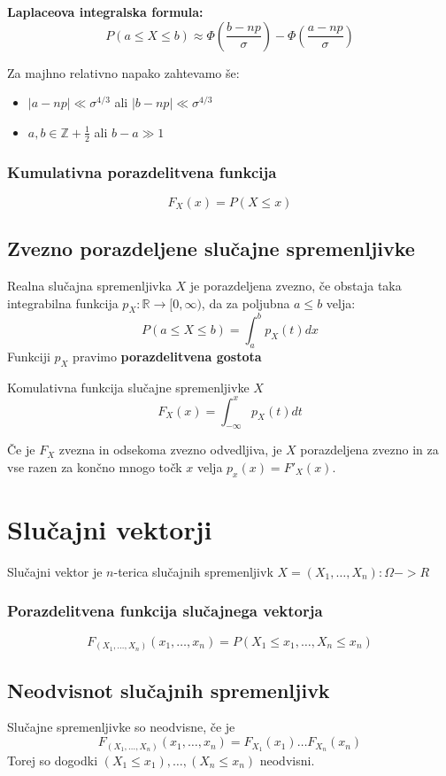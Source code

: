 \begin{multicols}{5}
\textbf{Laplaceova integralska formula: }
\[ P(a \leq X \leq b) \approx \Phi\left( \frac{b - np}{\sigma} \right) - \Phi\left( \frac{a - np}{\sigma} \right) \]

Za majhno relativno napako zahtevamo še: 
\begin{itemize}
    \item $|a-np| \ll \sigma^{4/3}$ ali $|b-np| \ll \sigma^{4/3}$ 	
    \item $a, b \in \mathbb{Z} + \frac{1}{2}$ ali $b - a \gg 1$
\end{itemize}

\subsubsection{Kumulativna porazdelitvena funkcija}
\[ F_X(x) = P(X \leq x)\]

\subsection{Zvezno porazdeljene slučajne spremenljivke}
Realna slučajna spremenljivka $X$ je porazdeljena zvezno, če obstaja taka integrabilna funkcija $p_X: \mathbb{R} \to [0, \infty)$, da za poljubna $a \leq b$ velja:
\[ P( a \leq X \leq b) = \int_a^b p_X(t) dx \]
Funkciji $p_X$ pravimo \textbf{porazdelitvena gostota}


Komulativna funkcija slučajne spremenljivke $X$
\[ F_X(x) = \int_{-\infty}^x p_X(t) dt \]

Če je $F_X$ zvezna in odsekoma zvezno odvedljiva, je $X$ porazdeljena zvezno in za vse razen za končno mnogo točk $x$ velja $p_x(x) = F'_X(x)$.

\section{Slučajni vektorji}
Slučajni vektor je $n$-terica slučajnih spremenljivk $X = (X_1, \dots , X_n): \Omega -> R$ 

\subsubsection{Porazdelitvena funkcija slučajnega vektorja}
\[ F_{(X_1, \dots , X_n)}(x_1, \dots , x_n) = P(X_1 \leq x_1, \dots , X_n \leq x_n)\]

\subsection{Neodvisnot slučajnih spremenljivk}
Slučajne spremenljivke so neodvisne, če je
\[ F_{(X_1, \dots , X_n)}(x_1, \dots, x_n) = F_{X_1}(x_1) \dots F_{X_n}(x_n)\]
Torej so dogodki $(X_1 \leq x_1), \dots , (X_n \leq x_n)$ neodvisni.


\end{multicols}
